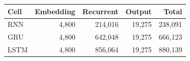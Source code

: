\footnotesize
\begin{tabular}{lrrrr}
\toprule
Cell & Embedding & Recurrent & Output & Total \\
\midrule
RNN & 4,800 & 214,016 & 19,275 & 238,091 \\
GRU & 4,800 & 642,048 & 19,275 & 666,123 \\
LSTM & 4,800 & 856,064 & 19,275 & 880,139 \\
\bottomrule
\end{tabular}
